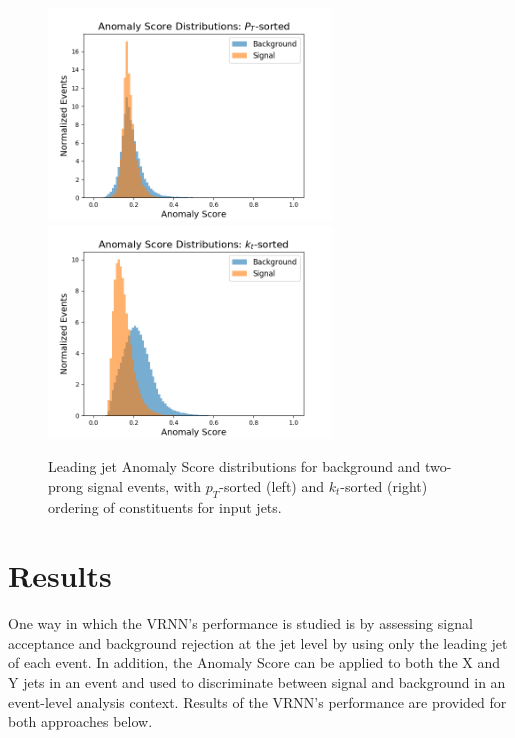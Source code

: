 \documentclass[11pt, a4paper]{article}
\begin{document}
\begin{figure}[H]
	\begin{center}
		\includegraphics[width=213pt]{imgs/Anom_Score_CompPt_SaveForPaper.png}
		\includegraphics[width=213pt]{imgs/Anom_Score_CompKt_Rev_Lead_SaveForPaper.png}
	\end{center}
	\caption{Leading jet Anomaly Score distributions for background and two-prong signal events, with $p_T$-sorted (left) and $k_{t}$-sorted (right) ordering of constituents for input jets.}
	\label{fig:score_comp}
\end{figure}


\section{Results}

One way in which the VRNN's performance is studied is by assessing signal acceptance and background rejection at the jet level by using only the leading jet of each event. In addition, the Anomaly Score can be applied to both the X and Y jets in an event and used to discriminate between signal and background in an event-level analysis context. Results of the VRNN's performance are provided for both approaches below.
\end{document}
